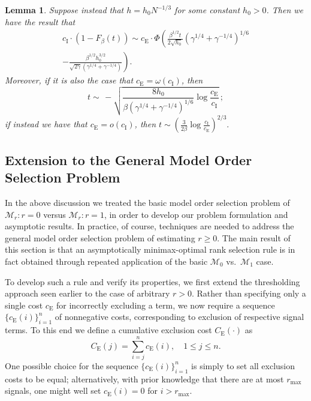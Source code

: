 \documentclass[final]{IEEEtran} %
\newtheorem{lemma}{Lemma}
\newcommand{\ce}{c_\text{E}}
\newcommand{\Ce}{C_\text{E}}
\newcommand{\ci}{c_\text{I}}
\begin{document}
\begin{lemma}\label{L:thresh-med-h}
    Suppose instead that $h = h_0 N^{-1/3}$ for some constant $h_0 > 0$.  Then we have the result that
    \begin{multline*}
        \ci
        \cdot
        (1 - F_\beta ( t ) )
        \sim
        \ce
        \cdot
        \Phi \!\left(
            \frac{\beta^{1/2} t}{ 2 \sqrt{ h_0 }}
            \left( \gamma^{1/4} + \gamma^{-1/4} \right)^{1/6} \right.
            \\
            -
            \left.
            \frac{ \beta^{1/2} h_0^{3/2} }
                 { \sqrt{ 2 \gamma }
                   \left( \gamma^{1/4} + \gamma^{-1/4} \right) }
        \right).
    \end{multline*}
    Moreover, if it is also the case that $\ce = \omega( \ci )$, then
    \[
        t
        \sim
        \,-
        \sqrt{
            \frac{ 8 h_0 }{ \beta (\gamma^{1/4} + \gamma^{-1/4} )^{1/6} }
            \log \frac{\ce}{\ci}
        } \,;
    \]
    if instead we have that $\ce = o( \ci )$, then
    $
        t
        \sim
        \left(
            \frac{3}{2 \beta}
            \log \frac{\ci}{\ce}
        \right)^{2/3}.
    $
\end{lemma}



\subsection{Extension to the General Model Order Selection Problem}

In the above discussion we treated the basic model order selection problem of $\mathcal{M}_r: r = 0$ versus $\mathcal{M}_r: r = 1$, in order to develop our problem formulation and asymptotic results.  In practice, of course, techniques are needed to address the general model order selection problem of estimating $r \geq 0$.  The main result of this section is that an asymptotically minimax-optimal rank selection rule is in fact obtained through repeated application of the basic $\mathcal{M}_0$ vs.~$\mathcal{M}_1$ case.

To develop such a rule and verify its properties, we first extend the thresholding approach seen earlier to the case of arbitrary $r > 0$.  Rather than specifying only a single cost $\ce$ for incorrectly excluding a term, we now require a sequence $\{\ce(i)\}_{i=1}^n$  of nonnegative costs, corresponding to exclusion of respective signal terms.  To this end we define a cumulative exclusion cost $\Ce(\cdot)$ as
\begin{equation}\label{E:Ce}
    \Ce(j) = \sum_{i=j}^n \ce(i), \quad 1 \leq j \leq n \text{.}
\end{equation}
One possible choice for the sequence $\{\ce(i)\}_{i=1}^n$ is simply to set all exclusion costs to be equal; alternatively, with prior knowledge that there are at most $r_\text{max}$ signals, one might well set $\ce(i) = 0$ for
$i > r_\text{max}$.
\end{document}
